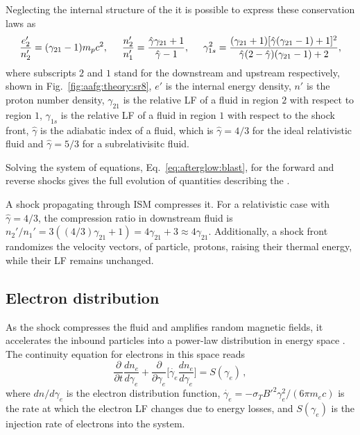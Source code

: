 Neglecting the internal structure of the \blast{} it is possible to express 
these conservation laws as \citep{Blandford:1976,Rezzolla:2013} 
\begin{equation}
\frac{e_2'}{n_2'} = (\gamma_{21} - 1)m_p c^2, \hspace{5mm}
\frac{n_2'}{n_1'} = \frac{\hat{\gamma}\gamma_{21} + 1}{\hat{\gamma}-1}, \hspace{5mm}
\gamma_{1s}^2 = \frac{(\gamma_{21} + 1) [\hat{\gamma}(\gamma_{21}-1)+1]^2}{\hat{\gamma}(2-\hat{\gamma})(\gamma_{21}-1)+2},
\label{eq:afterglow:blast}
\end{equation}
where subscripts $2$ and $1$ stand for the downstream and upstream respectively, 
shown in Fig.~\ref{fig:aafg:theory:sr8}, 
$e'$ is the internal energy density, $n'$ is the proton number density, 
$\gamma_{21}$ is the relative \ac{LF} of a fluid in region $2$ with respect to region $1$, 
$\gamma_{1s}$ is the relative \ac{LF} of a fluid in region $1$ with respect to the shock front,
$\hat{\gamma}$ is the adiabatic index of a fluid, which is $\hat{\gamma}=4/3$ 
for the ideal relativistic fluid and $\hat{\gamma}=5/3$ for a subrelativisitc fluid.

Solving the system of equations, Eq.~\eqref{eq:afterglow:blast}, for the 
forward and reverse shocks gives the full evolution of 
quantities describing the \blast{}. 

A shock propagating through \ac{ISM} compresses it. 
For a relativistic case with $\hat{\gamma}=4/3$, the compression ratio in downstream fluid is 
$n_2'/n_1' = 3 ((4/3)\gamma_{21} + 1) = 4\gamma_{21} + 3 \approx 4 \gamma_{21}$. 
%
Additionally, a shock front randomizes the velocity vectors,
of particle, protons, raising their thermal energy, while their \ac{LF} remains
unchanged.


\subsection{Electron distribution}

As the shock compresses the fluid and amplifies random magnetic fields, it accelerates the 
inbound particles into a power-law distribution in energy space 
\citep[\eg][]{Kumar:2014upa}. 
%
The continuity equation for electrons in this space reads 
\begin{equation}
\label{eq:intro:electron_dist_cont_eq}
\frac{\partial }{\partial t}\frac{d n_e}{d\gamma_e} + \frac{\partial}{\partial \gamma_e}\Big[ \dot{\gamma_e}\frac{dn_e}{d\gamma_e} \Big] = S(\gamma_e)\, ,
\end{equation}
%
where $dn/d\gamma_e$ is the electron distribution function, 
$\dot{\gamma_e} = -\sigma_T B'^2 \gamma_e^2 / (6\pi m_e c)$ is the rate at 
which the electron \ac{LF} changes due to energy losses, 
and $S(\gamma_e)$ is the injection 
rate of electrons into the system.

